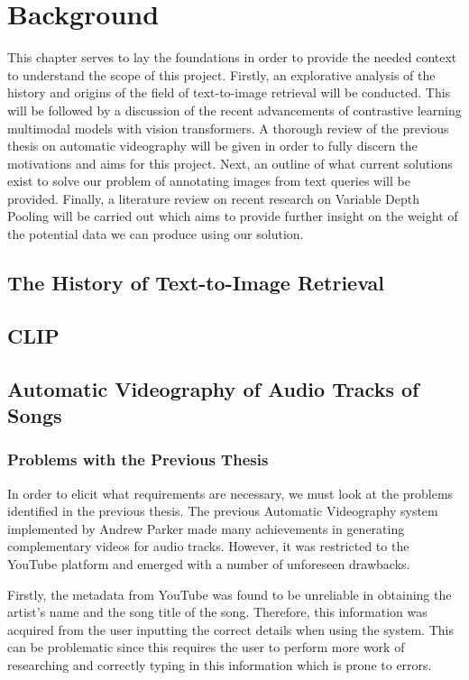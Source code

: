 \documentclass{l4proj}
\begin{document}
\chapter{Background}
This chapter serves to lay the foundations in order to provide the needed context to understand the scope of this project. Firstly, an explorative analysis of the history and origins of the field of text-to-image retrieval will be conducted. This will be followed by a discussion of the recent advancements of contrastive learning multimodal models with vision transformers. A thorough review of the previous thesis on automatic videography will be given in order to fully discern the motivations and aims for this project. Next, an outline of what current solutions exist to solve our problem of annotating images from text queries will be provided. Finally, a literature review on recent research on Variable Depth Pooling will be carried out which aims to provide further insight on the weight of the potential data we can produce using our solution.

\section{The History of Text-to-Image Retrieval}



\section{CLIP}



\section{Automatic Videography of Audio Tracks of Songs}
\label{sec:background_parker}
\subsection{Problems with the Previous Thesis}
In order to elicit what requirements are necessary, we must look at the problems identified in the previous thesis.
The previous Automatic Videography system implemented by Andrew Parker made many achievements in generating complementary videos for audio tracks. However, it was restricted to the YouTube platform and emerged with a number of unforeseen drawbacks. 

Firstly, the metadata from YouTube was found to be unreliable in obtaining the artist's name and the song title of the song. Therefore, this information was acquired from the user inputting the correct details when using the system. This can be problematic since this requires the user to perform more work of researching and correctly typing in this information which is prone to errors. 
\end{document}
